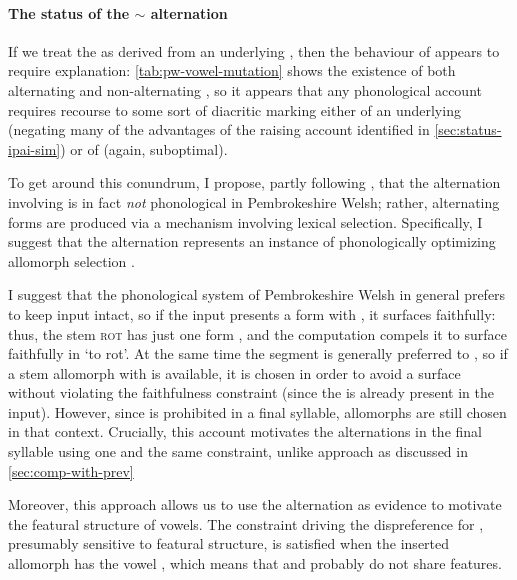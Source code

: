 \paragraph{The status of the \ipa{[u]} $\sim$ \ipa{[ə]} alternation}
\label{sec:status-ipau-sim}

If we treat the \alternation{[i]}{[ə]} as derived from an underlying , then the behaviour of \ipa{[u]} appears to require explanation: \cref{tab:pw-vowel-mutation} shows the existence of both alternating and non\hyp alternating \ipa{[u]}, so it appears that any phonological account requires recourse to some sort of diacritic marking either of an underlying \ipa{[ə]} (negating many of the advantages of the raising account identified in \cref{sec:status-ipai-sim}) or of \ipa{[u]} (again, suboptimal).

To get around this conundrum, I propose, partly following \citet{greenbook}, that the alternation involving \ipa{[ə]} is in fact \emph{not} phonological in Pembrokeshire Welsh; rather, alternating forms are produced via a mechanism involving lexical selection. Specifically, I suggest that the alternation represents an instance of phonologically optimizing allomorph selection \citep{tranel96:_frenc,tranel98:_suppl_ot,kager96,lapointe01:_stem_ot,rubach-booij2001,bermudez-otero06:_morph_spanis,wolf08:_optim_inter}.

I suggest that the phonological system of Pembrokeshire Welsh in general prefers to keep input  intact, so if the input presents a form with \ipa{[u]}, it surfaces faithfully: thus, the stem \textsc{rot} has just one form , and the computation compels it to surface faithfully in \ipa{[ˈpudri]} `to rot'. At the same time the segment \ipa{[ə]} is generally preferred to \ipa{[u]}, so if a stem allomorph with \ipa{[ə]} is available, it is chosen in order to avoid a surface \ipa{[u]} without violating the faithfulness constraint (since the \ipa{[ə]} is already present in the input). However, since \ipa{[ə]} is prohibited in a final syllable, \ipa{[u]} allomorphs are still chosen in that context. Crucially, this account motivates the \ipa{[ə]} alternations in the final syllable using one and the same constraint, unlike  approach as discussed in \cref{sec:comp-with-prev}

Moreover, this approach allows us to use the alternation as evidence to motivate the featural structure of vowels. The constraint driving the dispreference for \ipa{[u]}, presumably sensitive to featural structure, is satisfied when the inserted allomorph has the vowel \ipa{[ə]}, which means that \ipa{[ə]} and \ipa{[u]} probably do not share features.

